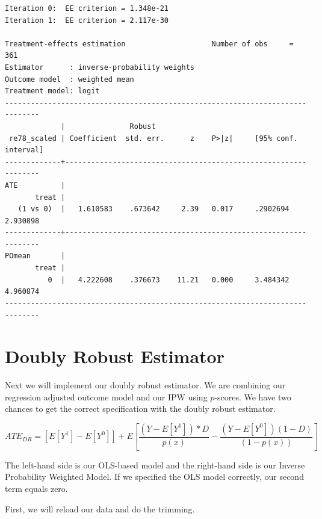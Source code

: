 \documentclass[
]{book}
\begin{document}
\begin{verbatim}
Iteration 0:  EE criterion = 1.348e-21  
Iteration 1:  EE criterion = 2.117e-30  

Treatment-effects estimation                    Number of obs     =        361
Estimator      : inverse-probability weights
Outcome model  : weighted mean
Treatment model: logit
------------------------------------------------------------------------------
             |               Robust
 re78_scaled | Coefficient  std. err.      z    P>|z|     [95% conf. interval]
-------------+----------------------------------------------------------------
ATE          |
       treat |
   (1 vs 0)  |   1.610583    .673642     2.39   0.017     .2902694    2.930898
-------------+----------------------------------------------------------------
POmean       |
       treat |
          0  |   4.222608    .376673    11.21   0.000     3.484342    4.960874
------------------------------------------------------------------------------
\end{verbatim}

\chapter{Doubly Robust Estimator}\label{doubly-robust-estimator}

Next we will implement our doubly robust estimator. We are combining our regression adjusted outcome model and our IPW using \(p\)-scores. We have two chances to get the correct specification with the doubly robust estimator.

\[ ATE_{DR} = \left[ E[Y^1]-E[Y^0]\right]+E\left[\frac{(Y-E[Y^1])*D}{p(x)}-\frac{(Y-E[Y^0])(1-D)}{(1-p(x))} \right] \]

The left-hand side is our OLS-based model and the right-hand side is our Inverse Probability Weighted Model. If we specified the OLS model correctly, our second term equals zero.

First, we will reload our data and do the trimming.
\end{document}
